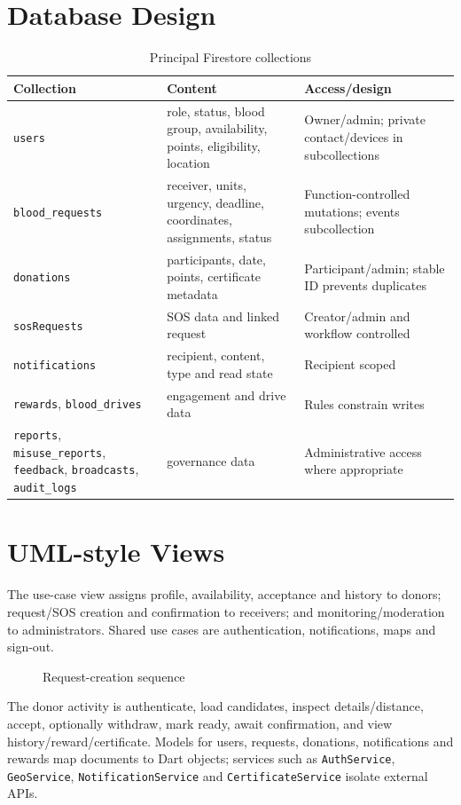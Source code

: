 \section{Database Design}
\begin{table}[H]\small\centering\caption{Principal Firestore collections}\begin{tabularx}{\textwidth}{p{3cm}XX}\toprule Collection&Content&Access/design\\\midrule
\texttt{users}&role, status, blood group, availability, points, eligibility, location&Owner/admin; private contact/devices in subcollections\\
\texttt{blood\_requests}&receiver, units, urgency, deadline, coordinates, assignments, status&Function-controlled mutations; events subcollection\\
\texttt{donations}&participants, date, points, certificate metadata&Participant/admin; stable ID prevents duplicates\\
\texttt{sosRequests}&SOS data and linked request&Creator/admin and workflow controlled\\
\texttt{notifications}&recipient, content, type and read state&Recipient scoped\\
\texttt{rewards}, \texttt{blood\_drives}&engagement and drive data&Rules constrain writes\\
\texttt{reports}, \texttt{misuse\_reports}, \texttt{feedback}, \texttt{broadcasts}, \texttt{audit\_logs}&governance data&Administrative access where appropriate\\\bottomrule\end{tabularx}\end{table}
\section{UML-style Views}
The use-case view assigns profile, availability, acceptance and history to donors; request/SOS creation and confirmation to receivers; and monitoring/moderation to administrators. Shared use cases are authentication, notifications, maps and sign-out.
\begin{figure}[H]\centering
{}\caption{Request-creation sequence}\end{figure}
The donor activity is authenticate, load candidates, inspect details/distance, accept, optionally withdraw, mark ready, await confirmation, and view history/reward/certificate. Models for users, requests, donations, notifications and rewards map documents to Dart objects; services such as \texttt{AuthService}, \texttt{GeoService}, \texttt{NotificationService} and \texttt{CertificateService} isolate external APIs.
